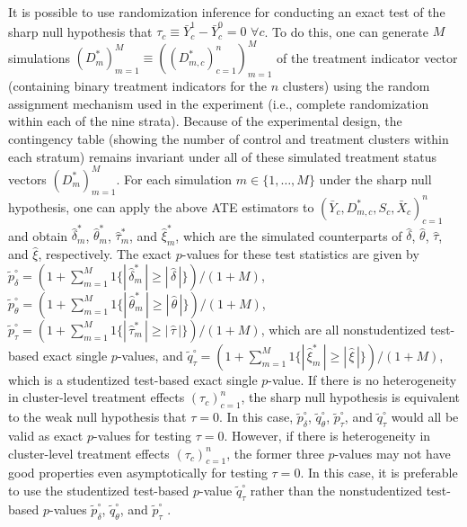 \documentclass[12pt]{article}
\begin{document}
It is possible to use randomization inference for conducting an exact test of the sharp null hypothesis that $\tau_c \equiv \bar{Y}^1_c - \bar{Y}^0_c = 0 \,\,\forall c$. To do this, one can generate $M$ simulations $(D^{*}_m)_{m = 1}^M \equiv ((D^{*}_{m,c})_{c = 1}^n)_{m = 1}^M$ of the treatment indicator vector (containing binary treatment indicators for the $n$ clusters) using the random assignment mechanism used in the experiment (i.e., complete randomization within each of the nine strata). Because of the experimental design, the contingency table (showing the number of control and treatment clusters within each stratum) remains invariant under all of these simulated treatment status vectors $(D^{*}_m)_{m = 1}^M$. For each simulation $m \in \{1, \dots, M\}$ under the sharp null hypothesis, one can apply the above ATE estimators to $(\bar{Y}_c, D^{*}_{m,c}, S_c, \bar{X}_c)_{c = 1}^n$ and obtain $\widehat{\delta}^*_m$, $\widehat{\theta}^*_m$, $\widehat{\tau}^*_m$, and $\widehat{\xi}^*_m$, which are the simulated counterparts of $\widehat{\delta}$, $\widehat{\theta}$, $\widehat{\tau}$, and $\widehat{\xi}$, respectively. The exact $p$-values for these test statistics are given by $\tilde{p}^\circ_\delta = (1 + \sum_{m = 1}^M 1\{|\,\widehat{\delta}^*_m\,| \geq |\,\widehat{\delta}\,|\})/(1 + M)$, $\tilde{p}^\circ_\theta = (1 + \sum_{m = 1}^M 1\{|\,\widehat{\theta}^*_m\,| \geq |\,\widehat{\theta}\,|\})/(1 + M)$, $\tilde{p}^\circ_\tau = (1 + \sum_{m = 1}^M 1\{|\,\widehat{\tau}^*_m\,| \geq |\,\widehat{\tau}\,|\})/(1 + M)$, which are all nonstudentized test-based exact single $p$-values, and $\tilde{q}^\circ_\tau = (1 + \sum_{m = 1}^M 1\{|\,\widehat{\xi}^*_m\,| \geq |\,\widehat{\xi}\,|\})/(1 + M)$, which is a studentized test-based exact single $p$-value. If there is no heterogeneity in cluster-level treatment effects $(\tau_c)_{c = 1}^n$, the sharp null hypothesis is equivalent to the weak null hypothesis that $\tau = 0$. In this case, $\tilde{p}^\circ_\delta$, $\tilde{q}^\circ_\theta$, $\tilde{p}^\circ_\tau$, and $\tilde{q}^\circ_\tau$ would all be valid as exact $p$-values for testing $\tau = 0$. However, if there is heterogeneity in cluster-level treatment effects $(\tau_c)_{c = 1}^n$, the former three $p$-values may not have good properties even asymptotically for testing $\tau = 0$. In this case, it is preferable to use the studentized test-based $p$-value $\tilde{q}^\circ_\tau$ rather than the nonstudentized test-based $p$-values $\tilde{p}^\circ_\delta$, $\tilde{q}^\circ_\theta$, and $\tilde{p}^\circ_\tau$ \citep[see, e.g., ][]{wu2020randomization}.
\end{document}
